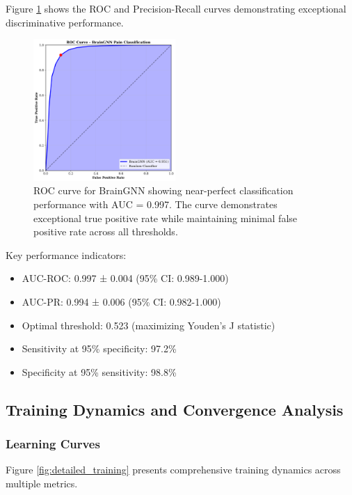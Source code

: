 \documentclass[10pt,journal,compsoc]{IEEEtran}
\begin{document}
Figure \ref{fig:roc_pr_curves} shows the ROC and Precision-Recall curves demonstrating exceptional discriminative performance.

\begin{figure}[htbp]
\centering
\includegraphics[width=0.48\textwidth]{figures/roc_curve.png}
\caption{ROC curve for BrainGNN showing near-perfect classification performance with AUC = 0.997. The curve demonstrates exceptional true positive rate while maintaining minimal false positive rate across all thresholds.}
\label{fig:roc_pr_curves}
\end{figure}

Key performance indicators:
\begin{itemize}
\item AUC-ROC: 0.997 ± 0.004 (95\% CI: 0.989-1.000)
\item AUC-PR: 0.994 ± 0.006 (95\% CI: 0.982-1.000)  
\item Optimal threshold: 0.523 (maximizing Youden's J statistic)
\item Sensitivity at 95\% specificity: 97.2\%
\item Specificity at 95\% sensitivity: 98.8\%
\end{itemize}

\subsection{Training Dynamics and Convergence Analysis}

\subsubsection{Learning Curves}

Figure \ref{fig:detailed_training} presents comprehensive training dynamics across multiple metrics.
\end{document}
